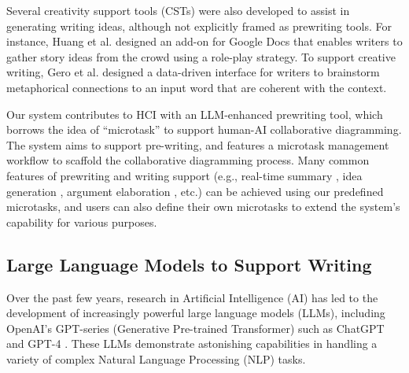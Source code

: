 Several creativity support tools (CSTs) were also developed to assist in generating writing ideas, although not explicitly framed as prewriting tools. For instance, Huang et al. \cite{huang2020heteroglossia} designed an add-on for Google Docs that enables writers to gather story ideas from the crowd using a role-play strategy. To support creative writing, Gero \cite{gero2019metaphoria} et al. designed a data-driven interface for writers to brainstorm metaphorical connections to an input word that are coherent with the context.

Our system contributes to HCI with an LLM-enhanced prewriting tool, which borrows the idea of ``microtask'' to support human-AI collaborative diagramming. The system aims to support pre-writing, and features a microtask management workflow to scaffold the collaborative diagramming process.
Many common features of prewriting and writing support (e.g., real-time summary \cite{dang2022beyond}, idea generation \cite{bernstein2010soylent}, argument elaboration \cite{uto2015academic}, etc.) can be achieved using our predefined microtasks, and users can also define their own microtasks to extend the system's capability for various purposes.

\subsection{Large Language Models to Support Writing}
Over the past few years, research in Artificial Intelligence (AI) has led to the development of increasingly powerful large language models (LLMs), including OpenAI's GPT-series \cite{radford2018improving} (Generative Pre-trained Transformer) such as ChatGPT and GPT-4 \cite{openai2023gpt4}. These LLMs demonstrate astonishing capabilities in handling a variety of complex Natural Language Processing (NLP) tasks.

